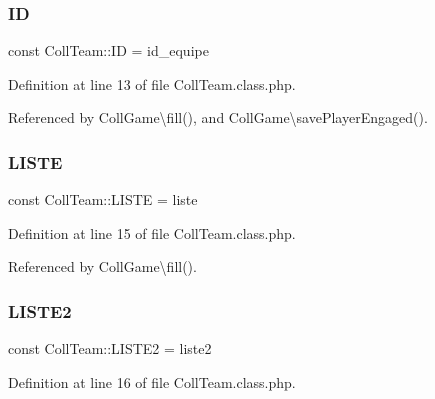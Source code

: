 \mbox{\label{class_coll_team_a2a09d3168ff4cf8d4ec181623e719414}} 
\subsubsection{\texorpdfstring{ID}{ID}}
{\footnotesize\ttfamily const Coll\+Team\+::\+ID = \textquotesingle{}id\+\_\+equipe\textquotesingle{}}



Definition at line 13 of file Coll\+Team.\+class.\+php.



Referenced by Coll\+Game\textbackslash{}fill(), and Coll\+Game\textbackslash{}save\+Player\+Engaged().

\mbox{\label{class_coll_team_aed7f711bccca6110bc9446cfc1e1edb9}} 
\subsubsection{\texorpdfstring{L\+I\+S\+TE}{LISTE}}
{\footnotesize\ttfamily const Coll\+Team\+::\+L\+I\+S\+TE = \textquotesingle{}liste\textquotesingle{}}



Definition at line 15 of file Coll\+Team.\+class.\+php.



Referenced by Coll\+Game\textbackslash{}fill().

\mbox{\label{class_coll_team_ad5d695c6603f6bc1a1035354bcf8ae1f}} 
\subsubsection{\texorpdfstring{L\+I\+S\+T\+E2}{LISTE2}}
{\footnotesize\ttfamily const Coll\+Team\+::\+L\+I\+S\+T\+E2 = \textquotesingle{}liste2\textquotesingle{}}



Definition at line 16 of file Coll\+Team.\+class.\+php.

\mbox{\label{class_coll_team_a652cc6c6a414c5124a17622287180572}} 

